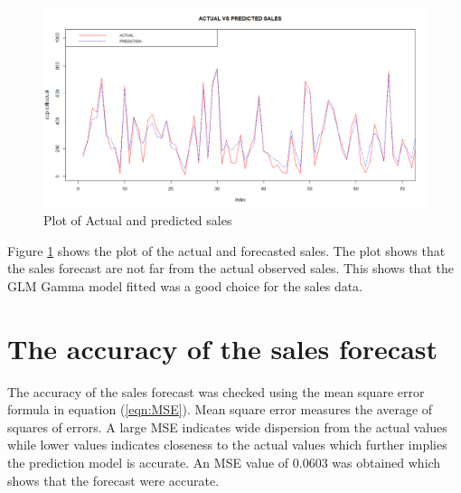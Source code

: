 \begin{figure}[H]
	\centering
	\includegraphics[width=0.9\linewidth]{screenshot005}
	\caption{Plot of Actual and predicted sales}
	\label{fig:plot accuracy}
\end{figure}

Figure \ref{fig:plot accuracy} shows the plot of the actual and forecasted sales. The plot shows that the sales forecast are not far from the actual observed sales. This shows that the GLM Gamma model fitted was a good choice for the sales data.
\section{The accuracy of the sales forecast}
 The accuracy of the sales forecast was checked using the mean square error formula in equation (\ref{eqn:MSE}).
 Mean square error measures the average of squares of errors. A large MSE indicates wide dispersion from the actual values while lower values indicates closeness to the actual values which further implies the prediction model is accurate. An MSE value of 0.0603 was obtained  which shows that the forecast were accurate.



